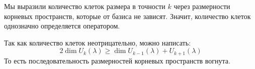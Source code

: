 \begin{conseq}
	Мы выразили количество клеток размера в точности $k$ через размерности корневых пространств,
	которые от базиса не зависят.
	Значит, количество клеток однозначно определяется оператором.
\end{conseq}
\begin{conseq}
	Так как количество клеток неотрицательно, можно написать:
	\[ 2\dim U_k(\lambda) \ge \dim U_{k-1}(\lambda) + U_{k+1}(\lambda) \]
	То есть последовательность размерностей корневых пространств вогнута.
\end{conseq}
